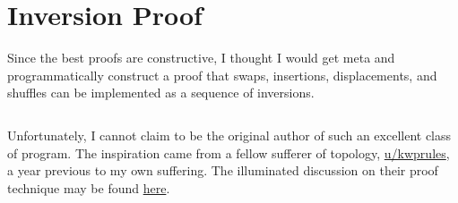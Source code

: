 \documentclass{article}
\begin{document}
\appendix\appendixpage{}\addappheadtotoc{}
\section{Inversion Proof}\label{app:proof}

Since the best proofs are constructive, I thought I would get meta and programmatically construct a
proof that swaps, insertions, displacements, and shuffles can be implemented as a sequence of
inversions.

\inputminted{python}{proof.py}

Unfortunately, I cannot claim to be the original author of such an excellent class of program. The
inspiration came from a fellow sufferer of topology,
\href{https://www.reddit.com/user/kwprules}{u/kwprules}, a year previous to my own suffering. The
illuminated discussion on their proof technique may be found
\href{https://www.reddit.com/r/math/comments/7gqhlc/what\_to\_say\_instead\_of\_trivially/}{here}.


{}
\end{document}
